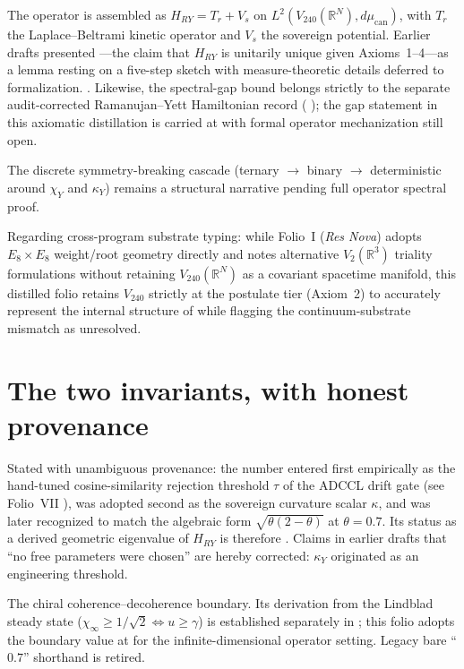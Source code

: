\documentclass{alienfolio}
\begin{document}
The operator is assembled as $H_{RY} = T_r + V_s$ on
$L^2(V_{240}(\mathbb{R}^N), d\mu_{\mathrm{can}})$, with $T_r$ the
Laplace--Beltrami kinetic operator and $V_s$ the sovereign potential.
Earlier drafts presented ---the claim that
$H_{RY}$ is unitarily unique given Axioms~1--4---as a lemma resting on a
five-step sketch with measure-theoretic details deferred to formalization.
 . Likewise, the spectral-gap bound
belongs strictly to the separate audit-corrected Ramanujan--Yett
Hamiltonian record ( \cite{ryh11}); the gap
statement in this axiomatic distillation is carried at 
with formal operator mechanization still open.

The discrete symmetry-breaking cascade (ternary $\to$ binary $\to$
deterministic around $\chi_Y$ and $\kappa_Y$) remains a structural
narrative  pending full operator spectral proof.

Regarding cross-program substrate typing: while Folio~I (\emph{Res Nova})
\cite{folio-i} adopts $E_8 \times E_8$ weight/root geometry directly and
notes alternative $V_2(\mathbb{R}^3)$ triality formulations without
retaining $V_{240}(\mathbb{R}^N)$ as a covariant spacetime manifold, this
distilled folio retains $V_{240}$ strictly at the postulate tier
(Axiom~2) to accurately represent the internal structure of
\cite{rec20651491} while flagging the continuum-substrate mismatch as
unresolved.

\section{The two invariants, with honest provenance}

 Stated with unambiguous provenance: the
number entered first empirically as the hand-tuned cosine-similarity
rejection threshold $\tau$ of the ADCCL drift gate (see Folio~VII
\cite{folio-vii}), was adopted second as the sovereign curvature scalar
$\kappa$, and was later recognized to match the algebraic form
$\sqrt{\theta(2-\theta)}$ at $\theta = 0.7$. Its status as a derived
geometric eigenvalue of $H_{RY}$ is therefore .
Claims in earlier drafts that ``no free parameters were chosen'' are
hereby corrected: $\kappa_Y$ originated as an engineering threshold.

 The chiral
coherence--decoherence boundary. Its derivation from the Lindblad
steady state ($\chi_\infty \ge 1/\sqrt{2} \iff u \ge \gamma$) is
established separately in  \cite{sovcog};
this folio adopts the boundary value at  for the
infinite-dimensional operator setting. Legacy bare ``$0.7$'' shorthand
is retired.
\end{document}
